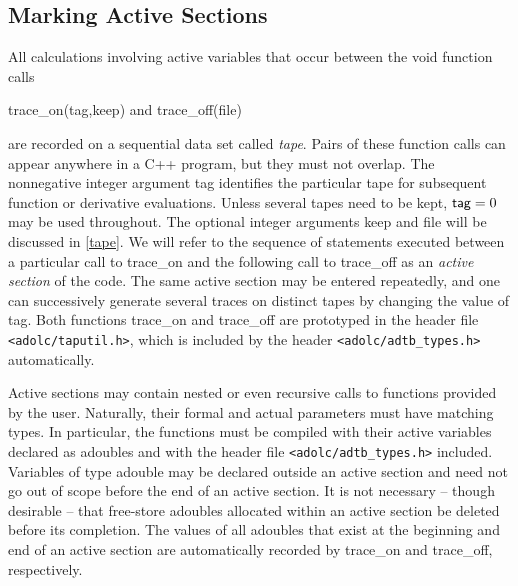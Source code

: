 \documentclass[11pt,twoside]{article}
\begin{document}
\subsection{Marking Active Sections}
\label{markingActive}
%
All calculations involving active variables that occur between
the void function calls
\begin{center}
{\sf trace\_on(tag,keep)} \hspace{0.3in} and \hspace{0.3in}
{\sf trace\_off(file)}
\end{center}
are recorded on a sequential data set called {\em tape}. Pairs of
these function calls can appear anywhere in a C++ program, but
they must not overlap. The nonnegative integer argument {\sf tag} identifies the
particular tape for subsequent function or derivative evaluations.
Unless several tapes need to be kept, ${\sf tag} =0$ may be used throughout.
The optional integer arguments {\sf keep} and
{\sf file} will be discussed in \autoref{tape}. We will refer to the
sequence of statements executed between a particular call to
{\sf trace\_on} and the following call to {\sf trace\_off} as an
{\em active section} of the code. The same active section may be
entered repeatedly, and one can successively generate several traces
on distinct tapes by changing the value of {\sf tag}. 
Both functions {\sf trace\_on} and {\sf trace\_off} are prototyped in
the header file \verb=<adolc/taputil.h>=, which is included by the header
\verb=<adolc/adtb_types.h>= automatically.

Active sections may contain nested or even recursive calls to functions
provided by the user. Naturally, their formal and actual parameters
must have matching types. In particular, the functions must be 
compiled with their active variables declared as
{\sf adouble}s and with the header file \verb=<adolc/adtb_types.h>= included.  
Variables of type {\sf adouble} may be declared outside an active section and need not
go out of scope before the end of an active section. 
It is not necessary -- though desirable -- that free-store {\sf adouble}s
allocated within
an active section be deleted before its completion. The values of all
{\sf adouble}s that exist at the beginning and end of an active section
are automatically 
recorded by {\sf trace\_on} and {\sf trace\_off}, respectively.
%
\end{document}
